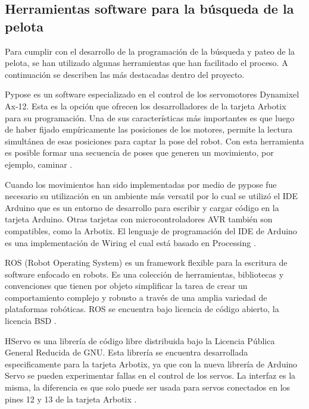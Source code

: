 \subsection{Herramientas software para la b\'usqueda de la pelota } \label{subsection:Herrbusqueda}

Para cumplir con el desarrollo de la programación de la búsqueda y pateo de la pelota, se han utilizado algunas herramientas que han facilitado el proceso. A continuación se describen las más destacadas dentro del proyecto. 

Pypose \cite{pypose} es un software especializado en el control de los servomotores Dynamixel Ax-12. Esta es la opci\'on que ofrecen los desarrolladores de la tarjeta Arbotix para su programaci\'on. Una de sus  características más importantes es que luego de haber fijado empíricamente las posiciones de los motores, permite la lectura simultánea de esas posiciones para captar la pose del robot. Con esta herramienta es posible formar una secuencia de poses que generen un movimiento, por ejemplo, caminar . 

Cuando los movimientos han sido implementadas por medio de pypose fue necesario su utilizaci\'on en un ambiente m\'as versatil por lo cual se utiliz\'o el IDE Arduino que es un entorno de desarrollo para escribir y cargar código en la tarjeta Arduino. Otras tarjetas con microcontroladores \gls{AVR} también son compatibles, como la Arbotix. El lenguaje de programación del IDE de Arduino es una implementación de Wiring el cual está basado en Processing \cite{arduino}.  

ROS (Robot Operating System) \cite{ros} es un \gls{framework} flexible para la escritura de software enfocado en robots. Es una colección de herramientas, bibliotecas y convenciones que tienen por objeto simplificar la tarea de crear un comportamiento complejo y robusto a través de una amplia variedad de plataformas robóticas. \gls{ROS} se encuentra bajo licencia de código abierto, la licencia \gls{BSD} .

HServo es una librería de código libre distribuida bajo la Licencia Pública General Reducida de GNU. Esta librería se encuentra desarrollada especificamente para la tarjeta Arbotix, ya que con la nueva librería de Arduino Servo se pueden experimentar fallas en el control de los servos. La interfaz es la misma, la diferencia es que solo puede ser usada para servos conectados en los pines 12 y 13 de la tarjeta Arbotix \cite{HServo}.    



